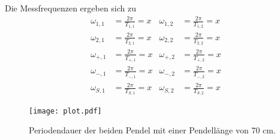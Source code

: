 Die Messfrequenzen ergeben sich zu
\begin{align}
\omega_{1,1} & = \frac{2π}{T_{1,1}}   = x & \omega_{1,2} & =  \frac{2π}{T_{1,2}}   = x \\
\omega_{2,1} & = \frac{2π}{T_{2,1}}  = x & \omega_{2,2} & =  \frac{2π}{T_{2,2}}  = x \\
\omega_{+,1} & = \frac{2π}{T_{+,1}}  = x & \omega_{+,2} & =  \frac{2π}{T_{+,2}}  = x \\
\omega_{-,1} & = \frac{2π}{T_{-,1}}  = x & \omega_{-,2} & =  \frac{2π}{T_{-,2}}  = x \\
\omega_{S,1} & = \frac{2π}{T_{S,1}} = x & \omega_{S,2} & =   \frac{2π}{T_{S,2}}     = x
\end{align} 



\begin{figure}
  \centering
  \texttt{[image: plot.pdf]}
  \caption{Periodendauer der beiden Pendel mit einer Pendellänge von 70 cm.}
  \label{fig:plot}
\end{figure}


